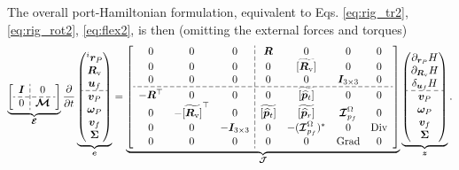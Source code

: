 \documentclass{svjour3}                     %
\DeclareMathOperator*{\Grad}{Grad}
\DeclareMathOperator*{\Div}{Div}
\newcommand{\crmat}[1]{\ensuremath{\widetilde{\left[#1\right]}}}
\begin{document}
	The overall port-Hamiltonian formulation, equivalent to Eqs. \eqref{eq:rig_tr2}, \eqref{eq:rig_rot2}, \eqref{eq:flex2}, is then (omitting the external forces and torques)
	\begin{equation}
	\label{eq:ph_mfd_all}
	\setlength{\dashlinegap}{2pt}
	\underbrace{
		{\left[ \begin{array}{c:c}
			\bm{I} & 0 \\
			\hdashline
			0 & \bm{\mathcal{M}} \\
			\end{array} \right]}
	}_{\bm{\mathcal{E}}}
	\diffp{}{t}
	\underbrace{
		\begin{pmatrix}
		^i \bm{r}_P \\ \bm{R}_{\text{v}} \\ \bm{u}_f \\\hdashline  \bm{v}_P \\ \bm\omega_P  \\ \bm{v}_f  \\ \bm\Sigma \\
		\end{pmatrix}
	}_{\bm{e}} = 
	\underbrace{
		{\left[ \begin{array}{ccc:cccc}
			0 & 0 & 0 &  \bm{R} & 0 & 0 & 0 \\
			0 & 0 & 0 & 0 & \crmat{\bm{R}_{\text{v}}} & 0 & 0 \\
			0 & 0 & 0 & 0 & 0 & \bm{I}_{3\times 3} & 0  \\ 
			\hdashline
			-\bm{R}^\top & 0 & 0 & 0 & \crmat{\widehat{\bm{p}}_t} & 0 & 0 \\
			0 & -\crmat{\bm{R}_{\text{v}}}^\top & 0 & \crmat{\widehat{\bm{p}}_t} & \crmat{\widehat{\bm{p}}_r} & \bm{\mathcal{I}}_{p_f}^\Omega & 0 \\
			0 & 0 & -\bm{I}_{3\times 3} & 0 & -(\bm{\mathcal{I}}_{p_f}^\Omega)^* & 0 & \Div \\
			0 & 0 & 0 & 0 & 0 & \Grad & 0 \\
			\end{array} \right]}
	}_{\bm{\mathcal{J}}}
	\underbrace{\begin{pmatrix}
		\partial_{\bm{r}_P}H \\ \partial_{\bm{R}_\text{v}}H \\ \delta_{\bm{u}_f} H \\\hdashline  \bm{v}_P \\ \bm\omega_P  \\ \bm{v}_f  \\ \bm\Sigma \\
		\end{pmatrix}}_{\bm{z}}.
	\end{equation} 
	
\end{document}
